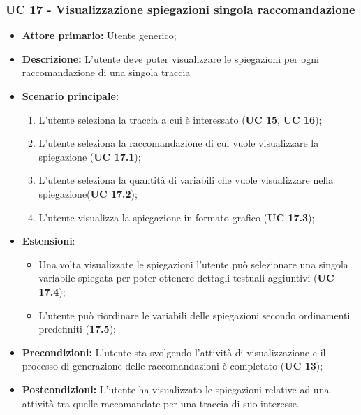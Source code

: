 \subsubsection{UC 17 - Visualizzazione spiegazioni singola raccomandazione}
\begin{itemize}
	\item \textbf{Attore primario:} Utente generico;
	\item \textbf{Descrizione:} L'utente deve poter visualizzare le spiegazioni per ogni raccomandazione di una singola traccia
	\item \textbf{Scenario principale:} 
		\begin{enumerate}
			\item L'utente seleziona la traccia a cui è interessato (\textbf{UC 15}, \textbf{UC 16});
			\item L'utente seleziona la raccomandazione di cui vuole visualizzare la spiegazione (\textbf{UC 17.1});
			\item L'utente seleziona la quantità di variabili che vuole visualizzare nella spiegazione(\textbf{UC 17.2});
			\item L'utente visualizza la spiegazione in formato grafico (\textbf{UC 17.3}); 
		\end{enumerate}
	\item \textbf{Estensioni}: 
	\begin{itemize}
		\item Una volta visualizzate le spiegazioni l'utente può selezionare una singola variabile spiegata per poter ottenere dettagli testuali aggiuntivi (\textbf{UC 17.4});
		\item L'utente può riordinare le variabili delle spiegazioni secondo ordinamenti predefiniti (\textbf{17.5});
	\end{itemize}

	\item \textbf{Precondizioni:} L'utente sta svolgendo l'attività di visualizzazione e il processo di generazione delle raccomandazioni è completato (\textbf{UC 13});
	\item \textbf{Postcondizioni:} L'utente ha visualizzato le spiegazioni relative ad una attività tra quelle raccomandate per una traccia di suo interesse.
\end{itemize}

